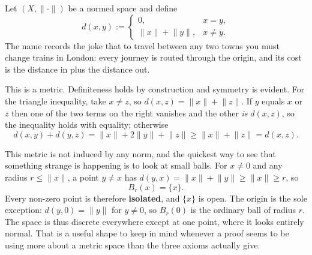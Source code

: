 \begin{example}
\label{ex:british_rail_metric}
Let $(X,\lVert\cdot\rVert)$ be a normed space and define
\[d(x,y) := \begin{cases} 0, & x = y, \\ \lVert x\rVert + \lVert y\rVert, & x \neq y.\end{cases}\]
The name records the joke that to travel between any two towns you must change trains in London:
every journey is routed through the origin, and its cost is the distance in plus the distance
out.

This is a metric. Definiteness holds by construction and symmetry is evident. For the triangle
inequality, take $x \neq z$, so $d(x,z) = \lVert x\rVert + \lVert z\rVert$. If $y$ equals $x$ or
$z$ then one of the two terms on the right vanishes and the other \emph{is} $d(x,z)$, so the
inequality holds with equality; otherwise
\[d(x,y) + d(y,z) = \lVert x\rVert + 2\lVert y\rVert + \lVert z\rVert
  \geq \lVert x\rVert + \lVert z\rVert = d(x,z).\]

\begin{remark}
This metric is not induced by any norm, and the quickest way to see that something strange is
happening is to look at small balls. For $x \neq 0$ and any radius $r \leq \lVert x\rVert$, a
point $y \neq x$ has $d(y,x) = \lVert x\rVert + \lVert y\rVert \geq \lVert x\rVert \geq r$, so
\[B_r(x) = \{x\}.\]
Every non-zero point is therefore \textbf{isolated}, and $\{x\}$ is open. The origin is the sole
exception: $d(y,0) = \lVert y\rVert$ for $y \neq 0$, so $B_r(0)$ is the ordinary ball of radius
$r$. The space is thus discrete everywhere except at one point, where it looks entirely normal.
That is a useful shape to keep in mind whenever a proof seems to be using more about a metric
space than the three axioms actually give.
\end{remark}
\end{example}

